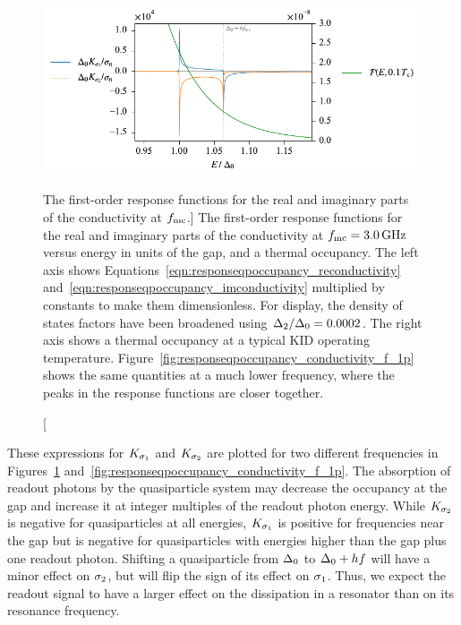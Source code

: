 \begin{figure}[htb]
\centering
\includegraphics[width=\textwidth]{theory/responseqpoccupancy_conductivity_f_mc.pdf}
\caption
[The first-order response functions for the real and imaginary parts of the conductivity at $f_{\mathrm{mc}}$.]
{The first-order response functions for the real and imaginary parts of the conductivity at $f_{\mathrm{mc}} = \SI{3.0}{GHz}$ versus energy in units of the gap, and a thermal occupancy.
The left axis shows Equations~\ref{eqn:responseqpoccupancy_reconductivity} and~\ref{eqn:responseqpoccupancy_imconductivity} multiplied by constants to make them dimensionless.
For display, the density of states factors have been broadened using $\Delta_2 / \Delta_0 = 0.0002$.
The right axis shows a thermal occupancy at a typical KID operating temperature.
Figure~\ref{fig:responseqpoccupancy_conductivity_f_1p} shows the same quantities at a much lower frequency, where the peaks in the response functions are closer together.}
\label{fig:responseqpoccupancy_conductivity_f_mc}
\end{figure}

These expressions for $K_{\sigma_1}$ and $K_{\sigma_2}$ are plotted for two different frequencies in Figures~\ref{fig:responseqpoccupancy_conductivity_f_mc} and~\ref{fig:responseqpoccupancy_conductivity_f_1p}.
The absorption of readout photons by the quasiparticle system may decrease the occupancy at the gap and increase it at integer multiples of the readout photon energy.
While $K_{\sigma_2}$ is negative for quasiparticles at all energies, $K_{\sigma_1}$ is positive for frequencies near the gap but is negative for quasiparticles with energies higher than the gap plus one readout photon.
Shifting a quasiparticle from $\Delta_0$ to $\Delta_0 + h f$ will have a minor effect on $\sigma_2$, but will flip the sign of its effect on $\sigma_1$.
Thus, we expect the readout signal to have a larger effect on the dissipation in a resonator than on its resonance frequency.

